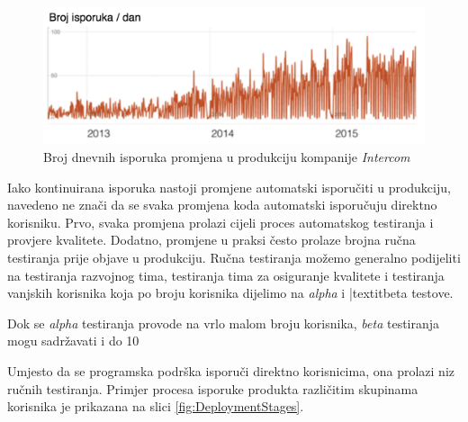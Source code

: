 \documentclass[times, utf8, diplomski, numeric]{fer}
\begin{document}
\begin{figure}
\centering
\includegraphics[scale=0.7]{IntercomShipsPerDay}
\caption{Broj dnevnih isporuka promjena u produkciju kompanije \textit{Intercom}}
\label{fig:IntercomShipsPerDay}
\end{figure}

Iako kontinuirana isporuka nastoji promjene automatski isporučiti u produkciju, navedeno ne znači da se svaka promjena koda automatski isporučuju direktno korisniku. Prvo, svaka promjena prolazi cijeli proces automatskog testiranja i provjere kvalitete. Dodatno, promjene u praksi često prolaze brojna ručna testiranja prije objave u produkciju. Ručna testiranja možemo generalno podijeliti na testiranja razvojnog tima, testiranja tima za osiguranje kvalitete i testiranja vanjskih korisnika koja po broju korisnika dijelimo na \textit{alpha} i |textit{beta} testove.

Dok se \textit{alpha} testiranja provode na vrlo malom broju korisnika, \textit{beta} testiranja mogu sadržavati i do 10%

Umjesto da se programska podrška isporuči direktno korisnicima, ona prolazi niz ručnih testiranja. Primjer procesa isporuke produkta različitim skupinama korisnika je prikazana na slici \ref{fig:DeploymentStages}.
\end{document}
